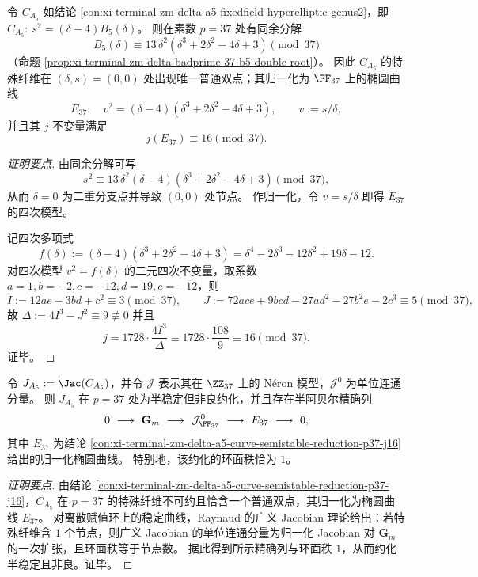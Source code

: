 

\begin{conclusion}[素数 \texorpdfstring{$p=37$}{p=37} 处的半稳定约化与 \texorpdfstring{$j\equiv 16$}{j=16}]\label{con:xi-terminal-zm-delta-a5-curve-semistable-reduction-p37-j16}
令 \(C_{A_5}\) 如结论 \ref{con:xi-terminal-zm-delta-a5-fixedfield-hyperelliptic-genus2}，即
\(
C_{A_5}:\ s^2=(\delta-4)B_5(\delta)
\)。
则在素数 \(p=37\) 处有同余分解
\[
B_5(\delta)\equiv 13\,\delta^2(\delta^3+2\delta^2-4\delta+3)\pmod{37}
\]
（命题 \ref{prop:xi-terminal-zm-delta-badprime-37-b5-double-root}）。
因此 \(C_{A_5}\) 的特殊纤维在 \((\delta,s)=(0,0)\) 处出现唯一普通双点；其归一化为 \(\FF_{37}\) 上的椭圆曲线
\[
E_{37}:\quad v^2=(\delta-4)(\delta^3+2\delta^2-4\delta+3),
\qquad v:=s/\delta,
\]
并且其 \(j\)-不变量满足
\[
j(E_{37})\equiv 16\pmod{37}.
\]
\end{conclusion}
\begin{proof}[证明要点]
由同余分解可写
\[
s^2\equiv 13\,\delta^2(\delta-4)(\delta^3+2\delta^2-4\delta+3)\pmod{37},
\]
从而 \(\delta=0\) 为二重分支点并导致 \((0,0)\) 处节点。
作归一化，令 \(v=s/\delta\) 即得 \(E_{37}\) 的四次模型。
\par
记四次多项式
\[
f(\delta):=(\delta-4)(\delta^3+2\delta^2-4\delta+3)=\delta^4-2\delta^3-12\delta^2+19\delta-12.
\]
对四次模型 \(v^2=f(\delta)\) 的二元四次不变量，取系数 \(a=1,b=-2,c=-12,d=19,e=-12\)，则
\[
I:=12ae-3bd+c^2\equiv 3\pmod{37},\qquad
J:=72ace+9bcd-27ad^2-27b^2e-2c^3\equiv 5\pmod{37},
\]
故
\(
\Delta:=4I^3-J^2\equiv 9\not\equiv 0
\)
并且
\[
j=1728\cdot\frac{4I^3}{\Delta}\equiv 1728\cdot\frac{108}{9}\equiv 16\pmod{37}.
\]
证毕。
\end{proof}

\begin{conclusion}[\texorpdfstring{$p=37$}{p=37} 处 \texorpdfstring{$\Jac(C_{A_5})$}{Jac(CA5)} 的半稳定约化：环面秩与椭圆归一化核]\label{con:xi-terminal-zm-delta-jac-ca5-neron-model-torus-rank1}
令 \(J_{A_5}:=\Jac(C_{A_5})\)，并令 \(\mathcal J\) 表示其在 \(\ZZ_{37}\) 上的 N\'eron 模型，\(\mathcal J^0\) 为单位连通分量。
则 \(J_{A_5}\) 在 \(p=37\) 处为半稳定但非良约化，并且存在半阿贝尔精确列
\[
0\ \longrightarrow\ \mathbf G_m\ \longrightarrow\ \mathcal J^0_{\FF_{37}}\ \longrightarrow\ E_{37}\ \longrightarrow\ 0,
\]
其中 \(E_{37}\) 为结论 \ref{con:xi-terminal-zm-delta-a5-curve-semistable-reduction-p37-j16} 给出的归一化椭圆曲线。
特别地，该约化的环面秩恰为 \(1\)。
\end{conclusion}
\begin{proof}[证明要点]
由结论 \ref{con:xi-terminal-zm-delta-a5-curve-semistable-reduction-p37-j16}，\(C_{A_5}\) 在 \(p=37\) 的特殊纤维不可约且恰含一个普通双点，其归一化为椭圆曲线 \(E_{37}\)。
对离散赋值环上的稳定曲线，Raynaud 的广义 Jacobian 理论给出：若特殊纤维含 \(1\) 个节点，则广义 Jacobian 的单位连通分量为归一化 Jacobian 对 \(\mathbf G_m\) 的一次扩张，且环面秩等于节点数。
据此得到所示精确列与环面秩 \(1\)，从而约化半稳定且非良。证毕。
\end{proof}





\endinput
